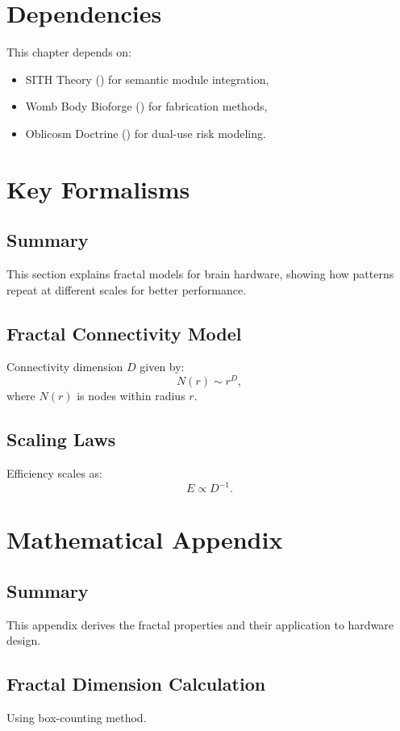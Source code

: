 \documentclass[11pt,oneside]{memoir}
\theoremstyle{plain}
\begin{document}
\section{Dependencies}
This chapter depends on:
\begin{itemize}
    \item SITH Theory () for semantic module integration,
    \item Womb Body Bioforge () for fabrication methods,
    \item Oblicosm Doctrine () for dual-use risk modeling.
\end{itemize}

\section{Key Formalisms}
\subsection{Summary}
This section explains fractal models for brain hardware, showing how patterns repeat at different scales for better performance.

\subsection{Fractal Connectivity Model}
Connectivity dimension \(D\) given by:
\begin{equation}
    N(r) \sim r^D,
\end{equation}
where \(N(r)\) is nodes within radius \(r\).

\subsection{Scaling Laws}
Efficiency scales as:
\begin{equation}
    E \propto D^{-1}.
\end{equation}

\section{Mathematical Appendix}
\subsection{Summary}
This appendix derives the fractal properties and their application to hardware design.

\subsection{Fractal Dimension Calculation}
Using box-counting method.
\end{document}
